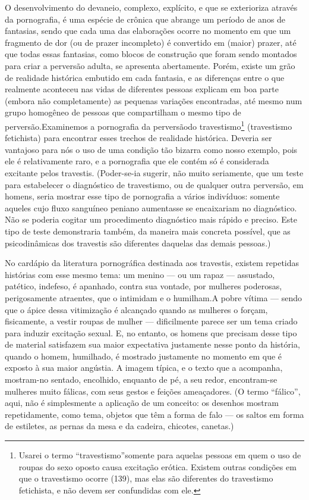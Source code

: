 O desenvolvimento do devaneio, complexo, explícito, e que se
exterioriza através da pornografia, é uma espécie de crônica que
abrange um período de anos de fantasias, sendo que cada uma das
elaborações ocorre no momento em que um fragmento de dor (ou de prazer
incompleto) é convertido em (maior) prazer, até que todas essas
fantasias, como blocos de construção que foram sendo montados para
criar a perversão adulta, se apresenta abertamente. Porém, existe um
grão de realidade histórica\idxpornoreal{} embutido em cada fantasia, e as diferenças
entre o que realmente aconteceu nas vidas de diferentes pessoas
explicam em boa parte (embora não completamente) as pequenas variações
encontradas, até mesmo num grupo homogêneo de pessoas que compartilham
o mesmo tipo de perversão.\idxtravemporn[|(] Examinemos a pornografia da perversão\idxtrave[|(] do
travestismo\footnote{ Usarei o termo
``travestismo''\idxtrave[|nn] somente para aquelas pessoas
em quem o uso de roupas do sexo oposto causa excitação erótica. Existem
outras condições em que o travestismo ocorre (139), mas elas são
diferentes do travestismo fetichista, e não devem ser confundidas com
ele.} (travestismo fetichista) para encontrar esses trechos de
realidade histórica. Deveria ser vantajoso para nós o uso de uma
condição tão bizarra como nosso exemplo, pois ele é relativamente raro,
e a pornografia que ele contém só é considerada excitante pelos
travestis. (Poder-se-ia sugerir, não muito seriamente, que um teste
	para estabelecer o diagnóstico\idxpornoinst{} de travestismo, ou de qualquer outra
perversão, em homens, seria mostrar esse tipo de pornografia a vários
indivíduos: somente aqueles cujo fluxo sanguíneo peniano aumentasse se
encaixariam no diagnóstico. Não se poderia cogitar um procedimento
diagnóstico mais rápido e preciso. Este tipo de teste demonstraria
também, da maneira mais concreta possível, que as psicodinâmicas dos
travestis são diferentes daquelas das demais pessoas.)

No cardápio da literatura pornográfica destinada aos travestis,
existem repetidas histórias com esse mesmo tema: um menino --- ou um
rapaz --- assustado, patético, indefeso, é apanhado, contra sua
vontade, por mulheres poderosas, perigosamente atraentes, que o
intimidam e o humilham.\idxtravemhumi[|(] A pobre vítima\idxpornoviti{} --- sendo que o ápice dessa
vitimização é alcançado quando as mulheres o forçam, fisicamente, a
vestir roupas de mulher --- dificilmente parece ser um tema criado
para induzir excitação sexual. E, no entanto, os homens que precisam
desse tipo de material satisfazem sua maior expectativa justamente
nesse ponto da história, quando o homem, humilhado, é mostrado
justamente no momento em que é exposto à sua maior angústia. A imagem
típica, e o texto que a acompanha, mostram-no sentado, encolhido,
enquanto de pé, a seu redor, encontram-se mulheres muito fálicas,\idxmulhf{} com
seus gestos e feições ameaçadores. (O termo
``fálico'', aqui, não é simplesmente a
aplicação de um conceito: os desenhos mostram repetidamente, como tema,
 objetos que têm a forma de falo --- os saltos em forma de estiletes,
as pernas da mesa e da cadeira, chicotes, canetas.)

